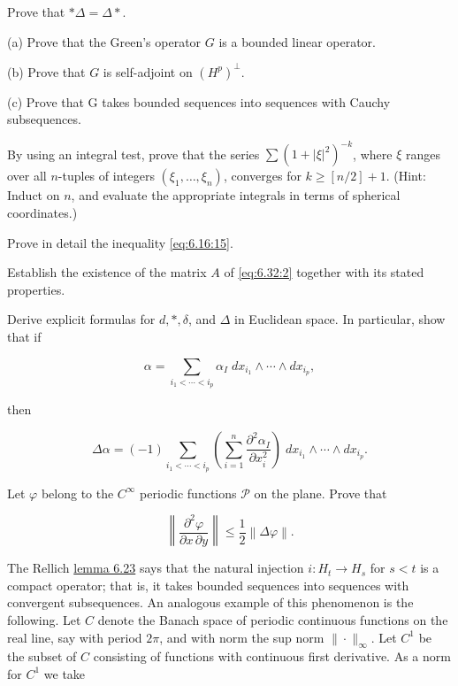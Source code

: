 \begin{problemset}

\item Prove that $*\Delta = \Delta*$.

\item (a) Prove that the Green's operator $G$ is a bounded linear operator.

(b) Prove that $G$ is self-adjoint on $(H^{p})^{\perp}$.

(c) Prove that G takes bounded sequences into sequences with Cauchy subsequences.

\item By using an integral test, prove that the series  $ \sum(1 + |\xi|^{2})^{-k} $, where  $ \xi $ ranges over all  $ n $-tuples of integers  $ (\xi_1, \ldots, \xi_n) $, converges for  $ k \geq [n/2] + 1 $. (Hint: Induct on  $ n $, and evaluate the appropriate integrals in terms of spherical coordinates.)

\item Prove in detail the inequality \eqref{eq:6.16:15}.

\item Establish the existence of the matrix $A$ of \eqref{eq:6.32:2} together with its stated properties.

\item Derive explicit formulas for $d, \ast, \delta$, and $\Delta$ in Euclidean space. In particular, show that if

\[
\alpha=\sum_{i_{1}<\cdots<i_{p}}\alpha_{I}\;d x_{i_{1}}\wedge\cdots\wedge d x_{i_{p}},
\]

then

\[
\Delta\alpha=(-1)\sum_{i_{1}<\cdots<i_{p}}\left(\sum_{i=1}^{n}\frac{\partial^{2}\alpha_{I}}{\partial x_{i}^{2}}\right)\;d x_{i_{1}}\wedge\cdots\wedge d x_{i_{p}}.
\]

\item Let $\varphi$ belong to the  $ C^{\infty} $ periodic functions  $ \mathcal{P} $ on the plane. Prove that

\[
\left\|\frac{\partial^{2}\varphi}{\partial x\,\partial y}\right\|\leq\frac{1}{2}\left\|\Delta\varphi\right\|.
\]

\item The Rellich \hyperref[thm:6.23]{lemma 6.23} says that the natural injection $i: H_{t} \to H_{s}$ for $s < t$ is a compact operator; that is, it takes bounded sequences into sequences with convergent subsequences. An analogous example of this phenomenon is the following. Let $C$ denote the Banach space of periodic continuous functions on the real line, say with period $2\pi$, and with norm the sup norm $\|\cdot\|_{\infty}$. Let $C^{1}$ be the subset of $C$ consisting of functions with continuous first derivative. As a norm for $C^{1}$ we take


\end{problemset}
